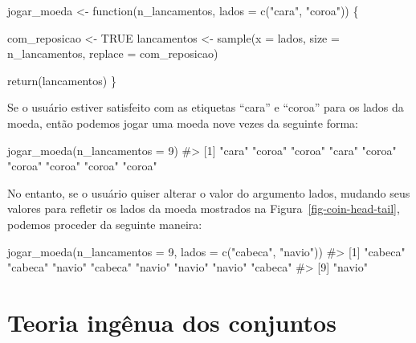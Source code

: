 \documentclass[
  letterpaper,
]{book}
\newenvironment{Shaded}{\begin{snugshade}}{\end{snugshade}}
\newcommand{\AttributeTok}[1]{\textcolor[rgb]{0.40,0.45,0.13}{#1}}
\newcommand{\CommentTok}[1]{\textcolor[rgb]{0.37,0.37,0.37}{#1}}
\newcommand{\ConstantTok}[1]{\textcolor[rgb]{0.56,0.35,0.01}{#1}}
\newcommand{\ControlFlowTok}[1]{\textcolor[rgb]{0.00,0.23,0.31}{#1}}
\newcommand{\DecValTok}[1]{\textcolor[rgb]{0.68,0.00,0.00}{#1}}
\newcommand{\FunctionTok}[1]{\textcolor[rgb]{0.28,0.35,0.67}{#1}}
\newcommand{\NormalTok}[1]{\textcolor[rgb]{0.00,0.23,0.31}{#1}}
\newcommand{\OtherTok}[1]{\textcolor[rgb]{0.00,0.23,0.31}{#1}}
\newcommand{\StringTok}[1]{\textcolor[rgb]{0.13,0.47,0.30}{#1}}
\theoremstyle{definition}
\theoremstyle{plain}
\theoremstyle{remark}
\begin{document}
\begin{Shaded}
\begin{Highlighting}[]
\NormalTok{jogar\_moeda }\OtherTok{\textless{}{-}} \ControlFlowTok{function}\NormalTok{(n\_lancamentos, }
                        \AttributeTok{lados =} \FunctionTok{c}\NormalTok{(}\StringTok{"cara"}\NormalTok{, }\StringTok{"coroa"}\NormalTok{)) \{}
  
\NormalTok{  com\_reposicao }\OtherTok{\textless{}{-}} \ConstantTok{TRUE}
\NormalTok{  lancamentos }\OtherTok{\textless{}{-}} \FunctionTok{sample}\NormalTok{(}\AttributeTok{x =}\NormalTok{ lados, }
                        \AttributeTok{size =}\NormalTok{ n\_lancamentos, }
                        \AttributeTok{replace =}\NormalTok{ com\_reposicao)}
  
  \FunctionTok{return}\NormalTok{(lancamentos)}
\NormalTok{\}}
\end{Highlighting}
\end{Shaded}

Se o usuário estiver satisfeito com as etiquetas ``cara'' e ``coroa''
para os lados da moeda, então podemos jogar uma moeda nove vezes da
seguinte forma:

\begin{Shaded}
\begin{Highlighting}[]
\FunctionTok{jogar\_moeda}\NormalTok{(}\AttributeTok{n\_lancamentos =} \DecValTok{9}\NormalTok{)}
\CommentTok{\#\textgreater{} [1] "cara"  "coroa" "coroa" "cara"  "coroa" "coroa" "coroa" "coroa" "coroa"}
\end{Highlighting}
\end{Shaded}

No entanto, se o usuário quiser alterar o valor do argumento lados,
mudando seus valores para refletir os lados da moeda mostrados na
Figura~\ref{fig-coin-head-tail}, podemos proceder da seguinte maneira:

\begin{Shaded}
\begin{Highlighting}[]
\FunctionTok{jogar\_moeda}\NormalTok{(}\AttributeTok{n\_lancamentos =} \DecValTok{9}\NormalTok{, }\AttributeTok{lados =} \FunctionTok{c}\NormalTok{(}\StringTok{"cabeca"}\NormalTok{, }\StringTok{"navio"}\NormalTok{))}
\CommentTok{\#\textgreater{} [1] "cabeca" "cabeca" "navio"  "cabeca" "navio"  "navio"  "navio"  "cabeca"}
\CommentTok{\#\textgreater{} [9] "navio"}
\end{Highlighting}
\end{Shaded}

\chapter{Teoria ingênua dos
conjuntos}\label{teoria-inguxeanua-dos-conjuntos}
\end{document}
